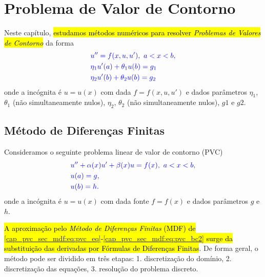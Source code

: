 
\chapter{Problema de Valor de Contorno}\label{cap_pvc}
\thispagestyle{fancy}

Neste capítulo, \hl{estudamos métodos numéricos para resolver \emph{Problemas de Valores de Contorno}} da forma
\begin{subequations}\hleq
  \begin{align}
    &u'' = f(x, u, u'), ~a < x < b,\\
    &\eta_1 u'(a) + \theta_1 u(b) = g_1\\
    &\eta_2 u'(b) + \theta_2 u(b) = g_2
\end{align}
\end{subequations}
onde a incógnita é $u = u(x)$ com dada $f = f(x, u, u')$ e dados parâmetros $\eta_1$, $\theta_1$ (não simultaneamente nulos), $\eta_2$, $\theta_2$ (não simultaneamente nulos), $g1$ e $g2$.

\section{Método de Diferenças Finitas}\label{cap_pvc_sec_mdf}

Consideramos o seguinte problema linear de valor de contorno (PVC)
\begin{subequations}\label{cap_pvc_sec_mdf:eq:pvc}\hleq
  \begin{align}
    &u'' + \alpha(x) u' + \beta(x) u = f(x), ~a < x < b, \label{cap_pvc_sec_mdf:eq:pvc_eq}\\
    &u(a) = g, \label{cap_pvc_sec_mdf:eq:pvc_bc1}\\
    &u(b) = h. \label{cap_pvc_sec_mdf:eq:pvc_bc2}
  \end{align}
\end{subequations}
onde a incógnita é $u = u(x)$ com dada fonte $f = f(x)$ e dados parâmetros $g$ e $h$.

\hl{A aproximação pelo \emph{Método de Diferenças Finitas} (MDF) de {\eqref{cap_pvc_sec_mdf:eq:pvc_eq}}-{\eqref{cap_pvc_sec_mdf:eq:pvc_bc2}} surge da substituição das derivadas por Fórmulas de Diferenças Finitas}. De forma geral, o método pode ser dividido em três etapas: 1. discretização do domínio, 2. discretização das equações, 3. resolução do problema discreto.

